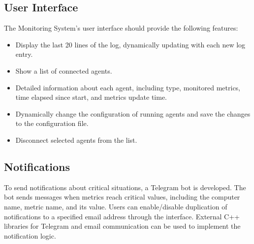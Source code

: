\documentclass[12pt, a4paper]{article}
\begin{document}
\subsection{User Interface}
The Monitoring System's user interface should provide the following features:
\begin{itemize}
    \item Display the last 20 lines of the log, dynamically updating with each new log entry.
    \item Show a list of connected agents.
    \item Detailed information about each agent, including type, monitored metrics, time elapsed since start, and metrics update time.
    \item Dynamically change the configuration of running agents and save the changes to the configuration file.
    \item Disconnect selected agents from the list.
\end{itemize}

\subsection{Notifications}
To send notifications about critical situations, a Telegram bot is developed. The bot sends messages when metrics reach critical values, including the computer name, metric name, and its value. Users can enable/disable duplication of notifications to a specified email address through the interface. External C++ libraries for Telegram and email communication can be used to implement the notification logic.
\end{document}
